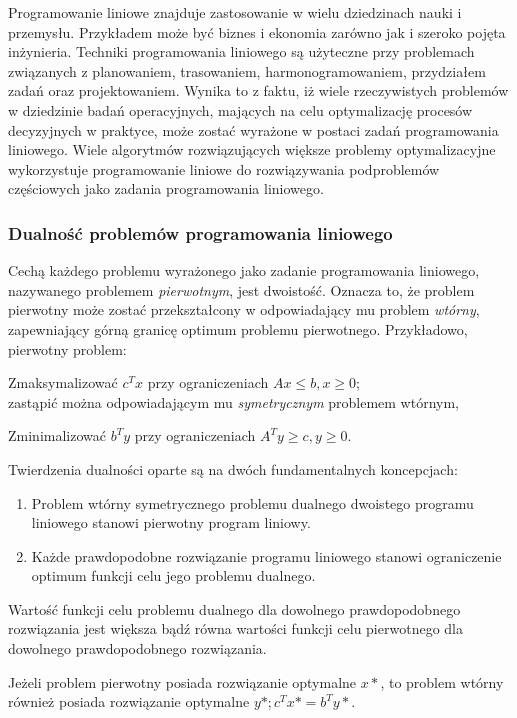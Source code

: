 \par{
  Programowanie liniowe znajduje zastosowanie w wielu dziedzinach nauki i przemysłu. 
  Przykładem może być biznes i ekonomia zarówno jak i szeroko pojęta inżynieria.
  Techniki programowania liniowego są użyteczne przy problemach związanych z
  planowaniem, trasowaniem, harmonogramowaniem, przydziałem zadań oraz
  projektowaniem.
  Wynika to z faktu, iż wiele rzeczywistych problemów w dziedzinie badań
  operacyjnych, mających na celu optymalizację procesów decyzyjnych w praktyce,
  może zostać wyrażone w postaci zadań programowania liniowego.
  Wiele algorytmów rozwiązujących większe problemy optymalizacyjne wykorzystuje
  programowanie liniowe do rozwiązywania podproblemów częściowych jako zadania 
  programowania liniowego.
}
\subsubsection{Dualność problemów programowania liniowego}\label{sss_lp_duality}
\par{
  Cechą każdego problemu wyrażonego jako zadanie programowania liniowego,
  nazywanego problemem \emph{pierwotnym}, jest dwoistość.
  Oznacza to, że problem pierwotny może zostać przekształcony w odpowiadający mu
  problem \emph{wtórny}, zapewniający górną granicę optimum problemu
  pierwotnego. 
  Przykładowo, pierwotny problem:\par
  Zmaksymalizować $c^{T}x$ przy ograniczeniach $Ax\leq b, x \geq 0$;\\
  zastąpić można odpowiadającym mu \emph{symetrycznym} problemem wtórnym,\par
  Zminimalizować $b^{T}y$ przy ograniczeniach $A^{T}y \geq c, y \geq 0$.\\
}
\par{
  Twierdzenia dualności oparte są na dwóch fundamentalnych koncepcjach:
  \begin{enumerate}
    \item Problem wtórny symetrycznego problemu dualnego dwoistego programu
      liniowego stanowi pierwotny program liniowy.
    \item Każde prawdopodobne rozwiązanie programu liniowego stanowi
      ograniczenie optimum funkcji celu jego problemu dualnego.
  \end{enumerate}

  \begin{weakduality*}
    Wartość funkcji celu problemu dualnego dla dowolnego prawdopodobnego
    rozwiązania jest większa bądź równa wartości funkcji celu pierwotnego dla
    dowolnego prawdopodobnego rozwiązania.
  \end{weakduality*}
  \begin{strongduality*}
    Jeżeli problem pierwotny posiada rozwiązanie optymalne $x*$, to problem wtórny
    również posiada rozwiązanie optymalne $y*; c^{T}x*=b^{T}y*$.
  \end{strongduality*}
}

